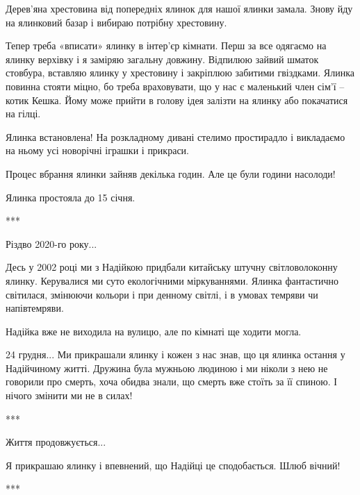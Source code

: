 
Дерев’яна хрестовина від попередніх ялинок для нашої ялинки замала. Знову йду
на ялинковий базар і вибираю потрібну хрестовину. 

Тепер треба «вписати» ялинку в інтер’єр кімнати. Перш за все одягаємо на ялинку
верхівку і я заміряю загальну довжину. Відпилюю зайвий шматок стовбура,
вставляю ялинку у хрестовину і закріплюю забитими гвіздками. Ялинка повинна
стояти міцно, бо треба враховувати, що у нас є маленький член сім’ї – котик
Кешка. Йому може прийти в голову ідея залізти на ялинку або покачатися на
гілці. 


Ялинка встановлена! На розкладному дивані стелимо простирадло і викладаємо на
ньому усі новорічні іграшки і прикраси. 

Процес вбрання ялинки зайняв декілька годин. Але це були години насолоди!

Ялинка простояла до 15 січня.


***

Різдво 2020-го року...

Десь у 2002 році ми з Надійкою придбали китайську штучну світловолоконну
ялинку. Керувалися ми суто екологічними міркуваннями. Ялинка фантастично
світилася, змінюючи кольори і при денному світлі, і в умовах темряви чи
напівтемряви. 


Надійка вже не виходила на вулицю, але по кімнаті ще ходити могла. 

24 грудня... Ми прикрашали ялинку і кожен з нас знав, що ця ялинка остання у
Надійчиному житті. Дружина була мужньою людиною і ми ніколи з нею не говорили
про смерть, хоча обидва знали, що смерть вже стоїть за її спиною. І нічого
змінити ми не в силах!


***

Життя продовжується... 

Я прикрашаю ялинку і впевнений, що Надійці це сподобається. Шлюб вічний!

***


